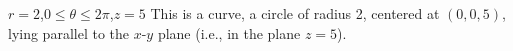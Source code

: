 {$r= 2$,\quad $0\leq \theta\leq 2\pi$,\quad $z=5$
}
{This is a curve, a circle of radius 2, centered at $(0,0,5)$, lying parallel to the $x$-$y$ plane (i.e., in the plane $z=5$).
}
